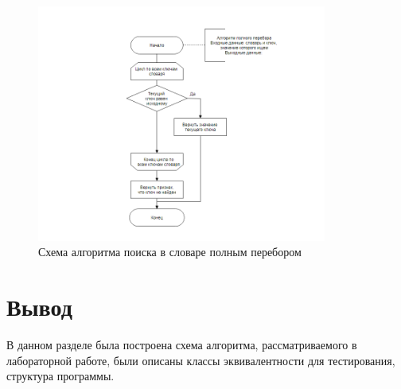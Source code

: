 \begin{figure}[h]
	\centering
	\includegraphics[width=0.85\textwidth]{img/full_comb.png}
	\caption{Схема алгоритма поиска в словаре полным перебором}
	\label{fig:full_comb}
\end{figure}

\section{Вывод}
В данном разделе была построена схема алгоритма, рассматриваемого в лабораторной работе, были описаны классы эквивалентности для тестирования, структура программы.
